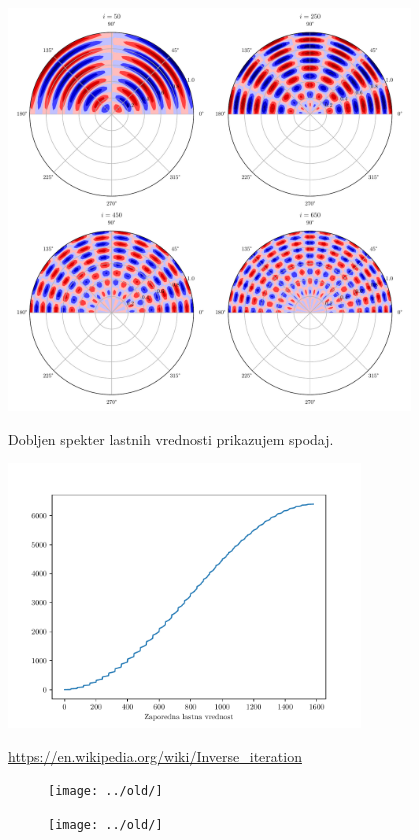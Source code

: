 \begin{center}
    \includegraphics[width=0.8\textwidth]{../old/2-nihajni_nacini_miks.pdf}
\end{center}
Dobljen spekter lastnih vrednosti prikazujem spodaj.
\begin{center}
\includegraphics[width=0.7\textwidth]{../old/2-spekter.pdf}
\end{center}


\begin{thebibliography}{9}
 \url{https://en.wikipedia.org/wiki/Inverse_iteration}

\end{thebibliography}


\begin{figure}
    \centering
        \begin{minipage}{0.45\textwidth}
        \centering
    \texttt{[image: ../old/]}
    \caption{}
        \label{fig:}
    \end{minipage}\hfill
    \begin{minipage}{0.45\textwidth}
        \centering
        \texttt{[image: ../old/]}
    \caption{}
    \label{fig:}
    \end{minipage}
\end{figure}
